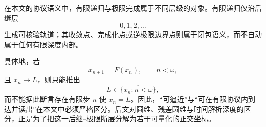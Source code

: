 \begin{remark}[后继步与极限完成的语义分界]\label{rem:cdim-successor-limit-gap}
在本文的协议语义中，有限递归与极限完成属于不同层级的对象。有限递归仅沿后继层
\[
0,1,2,\dots
\]
生成可核验轨道；其收敛点、完成化点或逆极限边界点则属于闭包语义，而不自动属于任何有限深度内部。
\par
具体地，若
\[
x_{n+1}=F(x_n),\qquad n<\omega,
\]
且 \(x_n\to L\)，则只能推出
\[
L\in\overline{\{x_n:n<\omega\}},
\]
而不能据此断言存在有限步 \(n\) 使 \(x_n=L\)。因此，“可逼近”与“可在有限协议内到达并读出”在本文中必须严格区分。后文对圆维、残差圆维与时间解析深度的区分，正是为了把这一后继--极限断层分解为若干可量化的正交坐标。
\end{remark}
